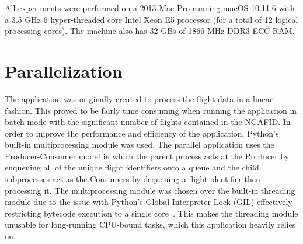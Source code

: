 	All experiments were performed on a 2013 Mac Pro running macOS 10.11.6 with a 3.5 GHz 6 hyper-threaded core Intel Xeon E5 processor (for a total of 12 logical processing cores). The machine also has 32 GBs of 1866 MHz DDR3 ECC RAM.


\section{Parallelization} \label{sec:parallelization}

	The application was originally created to process the flight data in a linear fashion.  This proved to be fairly time consuming when running the application in batch mode with the significant number of flights contained in the NGAFID.  In order to improve the performance and efficiency of the application, Python's built-in multiprocessing module was used.  The parallel application uses the Producer-Consumer model in which the parent process acts at the Producer by enqueuing all of the unique flight identifiers onto a queue and the child subprocesses act as the Consumers by dequeuing a flight identifier then processing it.  The multiprocessing module was chosen over the built-in threading module due to the issue with Python's Global Interpreter Lock (GIL) effectively restricting bytecode execution to a single core~\cite{beazley2010understanding}.  This makes the threading module unusable for long-running CPU-bound tasks, which this application heavily relies on.
	